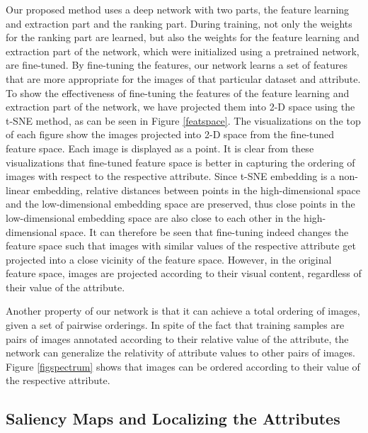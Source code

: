 Our proposed method uses a deep network with two parts, the feature learning and extraction part and the ranking part. During training, not only the weights for the ranking part are learned, but also the weights for the feature learning and extraction part of the network, which were initialized using a pretrained network, are fine-tuned. By fine-tuning the features, our network learns a set of features that are more appropriate for the images of that particular dataset and attribute. To show the effectiveness of fine-tuning the features of the feature learning and extraction part of the network, we have projected them into 2-D space using the t-SNE \cite{van2008visualizing} method, as can be seen in Figure \ref{featspace}. The visualizations on the top of each figure show the images projected into 2-D space from the fine-tuned feature space. Each image is displayed as a point. It is clear from these visualizations that fine-tuned feature space is better in capturing the ordering of images with respect to the respective attribute. Since t-SNE embedding is a non-linear embedding, relative distances between points in the high-dimensional space and the low-dimensional embedding space are preserved, thus close points in the low-dimensional embedding space are also close to each other in the high-dimensional space. It can therefore be seen that fine-tuning indeed changes the feature space such that images with similar values of the respective attribute get projected into a close vicinity of the feature space. However, in the original feature space, images are projected according to their visual content, regardless of their value of the attribute.

Another property of our network is that it can achieve a total ordering of images, given a set of pairwise orderings. In spite of the fact that training samples are pairs of images annotated according to their relative value of the attribute, the network can generalize the relativity of attribute values to other pairs of images. Figure \ref{figspectrum} shows that images can be ordered according to their value of the respective attribute. 

\subsection{Saliency Maps and Localizing the Attributes} \label{sec.4.5}

